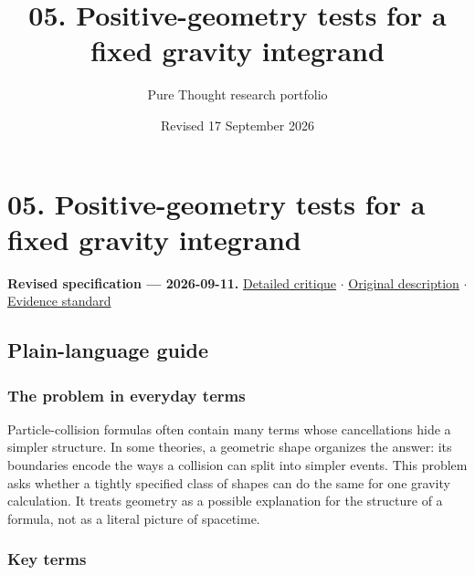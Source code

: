\documentclass[
  11pt,
]{article}
\title{05. Positive-geometry tests for a fixed gravity integrand}
\author{Pure Thought research portfolio}
\date{Revised 17 September 2026}
\begin{document}
\maketitle
\thispagestyle{empty}
\clearpage

\section{05. Positive-geometry tests for a fixed gravity integrand}

\textbf{Revised specification --- 2026-09-11.}
\href{https://github.com/rick-stevens-ai/Pure-Thought/blob/main/reviews/05-Positive-Geometry-Gravity.md}{Detailed
critique} \ensuremath{\cdot}
\href{https://github.com/rick-stevens-ai/Pure-Thought/blob/main/archive/original-PRDs/05-Positive-Geometry-Gravity.md}{Original
description} \ensuremath{\cdot}
\href{https://github.com/rick-stevens-ai/Pure-Thought/blob/main/reviews/EVIDENCE-STANDARD.md}{Evidence
standard}

\subsection{Plain-language guide}

\subsubsection{The problem in everyday terms}

Particle-collision formulas often contain many terms whose cancellations
hide a simpler structure. In some theories, a geometric shape organizes
the answer: its boundaries encode the ways a collision can split into
simpler events. This problem asks whether a tightly specified class of
shapes can do the same for one gravity calculation. It treats geometry
as a possible explanation for the structure of a formula, not as a
literal picture of spacetime.

\subsubsection{Key terms}
\end{document}
